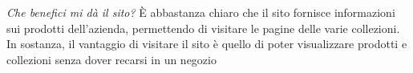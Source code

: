 \textit{Che benefici mi dà il sito?}\newline
\`E abbastanza chiaro che il sito fornisce informazioni sui prodotti dell'azienda, permettendo di visitare le pagine delle varie collezioni. In sostanza, il vantaggio di visitare il sito è quello di poter visualizzare prodotti e collezioni senza dover recarsi in un negozio